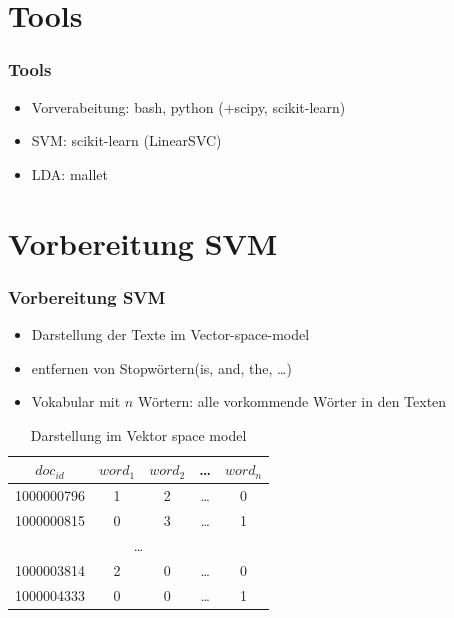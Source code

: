 \documentclass[12pt, xcolor=table]{beamer}
\begin{document}
\section{Tools}
\begin{frame}
    \frametitle{Tools}
    \begin{itemize}
        \item Vorverabeitung: bash, python (+scipy, scikit-learn)
        \item SVM: scikit-learn (LinearSVC)
        \item LDA: mallet
    \end{itemize}
\end{frame}

\section{Vorbereitung SVM}
\begin{frame}
    \frametitle{Vorbereitung SVM}
    \begin{itemize}
        \item Darstellung der Texte im Vector-space-model
        \item entfernen von Stopwörtern(is, and, the, \ldots)
        \item Vokabular mit $n$ Wörtern: alle vorkommende Wörter in den Texten
    \end{itemize}
        \begin{table}
            \begin{tabular}{c|cccc}
                \tiny\textbf{$doc_{id}$} &\tiny \textbf{$word_{1}$} &\tiny \textbf{$word_{2}$} &\tiny \textbf{\dots} & \tiny \textbf{$word_{n}$} \\
                \hline
                \tiny 1000000796 &\tiny 1 & \tiny 2 & \tiny  \dots  & \tiny 0 \\
                \tiny 1000000815 &\tiny 0 & \tiny 3 & \tiny \dots  & \tiny 1 \\
                \multicolumn{5}{c}{\dots} \\
                \tiny 1000003814 &\tiny 2  & \tiny 0 & \tiny  \dots  & \tiny 0 \\
                \tiny 1000004333 & \tiny 0 &\tiny 0 &\tiny  \dots & \tiny 1 \\
            \end{tabular}
             \caption*{Darstellung im Vektor space model}
        \end{table}
\end{frame}
\end{document}
